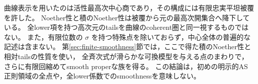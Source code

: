 \begin{remark}\label{rem:degree-one-relative-scope}
曲線表示を用いたのは活性最高次中心商であり，その構成には有限忠実平坦被覆を許した。
Noether性と積のNoether性は被覆から元の最高次開集合へ降下している。
全lower項を持つ高次元のtailsを曲線のcoherent圏と同一視するものではない。
また，有限位数の $\sigma$ を持つ特殊点を除いておらず，中心全体の普遍的な記述は含まない。
第\ref{sec:finite-smoothness}節では，ここで得た積のNoether性と相対tailsの性質を使い，
全斉次式が滑らかな可換模型を与える点のまわりで，
さらに有限回縮めてsmooth properな族を得る。
この結論は，初めの明示的AS正則領域の全点や，全lower係数でのsmoothnessを意味しない。
\end{remark}
